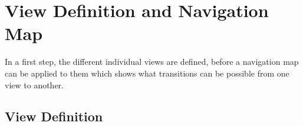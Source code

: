 
\section{View Definition and Navigation Map}


In a first step, the different individual views are defined, before a navigation map can be applied to them which shows what transitions can be possible from one view to another.



\subsection{View Definition}

